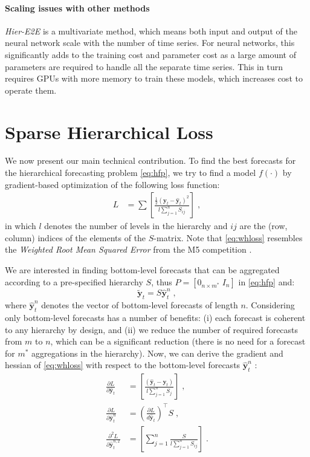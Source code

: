 \documentclass[preprint, 3p, times, twocolumn]{elsarticle}
\begin{document}
\paragraph{Scaling issues with other methods} \label{sec:scalingissuesneuralmethods} \textit{Hier-E2E} \cite{rangapuram_endtoend_2021} is a multivariate method, which means both input and output of the neural network scale with the number of time series. For neural networks, this significantly adds to the training cost and parameter cost as a large amount of parameters are required to handle all the separate time series. This in turn requires GPUs with more memory to train these models, which increases cost to operate them. 

\section{Sparse Hierarchical Loss} \label{sec:sparsehloss}
We now present our main technical contribution. To find the best forecasts for the hierarchical forecasting problem \eqref{eq:hfp}, we try to find a model \(f(\cdot)\) by gradient-based optimization of the following loss function:
\begin{align} \label{eq:whloss}
  L &= \sum \left[ \frac{\frac{1}{2}(\textbf{y}_{t} - \hat{\textbf{y}}_{t})^2}{l \sum_{j=1}^n S_{ij}} \right] \; ,
\end{align}
in which \(l\) denotes the number of levels in the hierarchy and \(ij\) are the (row, column) indices of the elements of the \(S\)-matrix. Note that \eqref{eq:whloss} resembles the \textit{Weighted Root Mean Squared Error} from the M5 competition \cite{makridakis_m5_2022}.

We are interested in finding bottom-level forecasts that can be aggregated according to a pre-specified hierarchy \(S\), thus \(P = [0_{n \times m^*} \; I_n] \) in \eqref{eq:hfp} and:
\begin{equation} \label{eq:hfpbu}
  \tilde{\textbf{y}}_{t} = S \hat{\textbf{y}}^n_{t} \;,
\end{equation}
where \(\hat{\textbf{y}}^n_{t}\) denotes the vector of bottom-level forecasts of length \(n\). 
Considering only bottom-level forecasts has a number of benefits: (i) each forecast is coherent to any hierarchy by design, and (ii) we reduce the number of required forecasts from \(m\) to \(n\), which can be a significant reduction (there is no need for a forecast for \(m^*\) aggregations in the hierarchy). 
Now, we can derive the gradient and hessian of \eqref{eq:whloss} with respect to the bottom-level forecasts \(\hat{\textbf{y}}^n_{t}\) : 
\begin{align} 
  \frac{\partial L}{\partial \hat{\textbf{y}}_{t}} &=  \left[ \frac{(\hat{\textbf{y}}_{t} - \textbf{y}_{t})}{l \sum_{j=1}^n S_{j}} \right] \;, \label{eq:hfp_grad} \\
  \frac{\partial L}{\partial \hat{\textbf{y}}^n_{t}} &= \left(\frac{\partial L}{d \hat{\textbf{y}}_{t}}\right)^\intercal S \;, \label{eq:hfpbu_grad}  \\
  \frac{\partial^2 L}{\partial \hat{\textbf{y}}_{t}^{n, 2}} &= \left[ \sum_{j=1}^n \frac{S}{l \sum_{j=1}^n S_{ij}} \right]\;. \label{eq:hfpbu_hess}                                               
\end{align}
\end{document}
